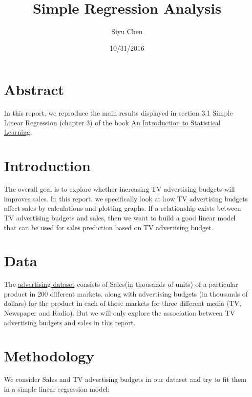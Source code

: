 \documentclass{article}
\begin{document}


\title{Simple Regression Analysis}

\author{Siyu Chen}

\date{10/31/2016}


\maketitle

\section{Abstract}

In this report, we reproduce the main results displayed in section 3.1 Simple Linear Regression (chapter 3) of the book \href{http://www-bcf.usc.edu/\%7Egareth/ISL/ISLR\%20Sixth\%20Printing.pdf}{An Introduction to Statistical Learning}.

\section{Introduction}
The overall goal is to explore whether increasing TV advertising budgets will improves sales. In this report, we specifically look at how TV advertising budgets affect sales by calculations and plotting graphs. If a relationship exists between TV advertising budgets and sales, then we want to build a good linear model that can be used for sales prediction based on TV advertising budget.

\section{Data}

The \href{http://www-bcf.usc.edu/\%7Egareth/ISL/Advertising.csv}{advertising dataset} consists of Sales(in thousands of units) of a particular product in 200 different markets, along with advertising budgets (in thousands of dollars) for the product in each of those markets for three different media (TV, Newspaper and Radio). But we will only explore the association between TV advertising budgets and sales in this report.


\section{Methodology}
We consider Sales and TV advertising budgets in our dataset and try to fit them in a simple linear regression model:
\end{document}
